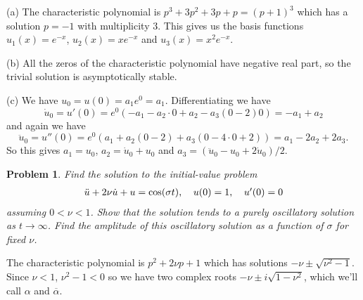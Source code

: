 \documentclass{article}
\newtheorem{problem}{Problem}
\begin{document}
(a) The characteristic polynomial is $p^3 + 3p^2 + 3p + p = (p+1)^3$ which has a solution $p = -1$ with multiplicity $3$. This gives us the basis functions $u_1(x) = e^{-x}$, $u_2(x) = xe^{-x}$ and $u_3(x) = x^2e^{-x}$.

(b) All the zeros of the characteristic polynomial have negative real part, so the trivial solution is asymptotically stable.

(c) We have $u_0 = u(0) = a_1e^{0} = a_1$. Differentiating we have
\[
\dot{u}_0 = u'(0) = e^0(-a_1 - a_2 \cdot 0 + a_2 - a_3(0 - 2)0) = -a_1 + a_2
\]
and again we have
\[
\ddot{u}_0 = u''(0) = e^0(a_1 + a_2(0-2) + a_3(0 - 4 \cdot 0 + 2)) = a_1 - 2a_2 + 2a_3.
\]
So this gives $a_1 = u_0$, $a_2 = \dot{u}_0 + u_0$ and $a_3 = (\ddot{u}_0 - u_0 + 2\dot{u}_0)/2$.

\begin{problem}
Find the solution to the initial-value problem
\[
\begin{tabular}{ccc}
$\ddot{u} + 2 \nu \dot{u} + u = \cos(\sigma t)$, & $u(0) = 1$, & $u'(0) = 0$
\end{tabular}
\]
assuming $0 < \nu < 1$. Show that the solution tends to a purely oscillatory solution as $t \rightarrow \infty$. Find the amplitude of this oscillatory solution as a function of $\sigma$ for fixed $\nu$.
\end{problem}

The characteristic polynomial is $p^2 + 2 \nu p + 1$ which has solutions $-\nu \pm \sqrt{\nu^2 - 1}$. Since $\nu < 1$, $\nu^2 - 1 < 0$ so we have two complex roots $-\nu \pm i \sqrt{1 - \nu^2}$, which we'll call $\alpha$ and $\overline{\alpha}$.
\end{document}
